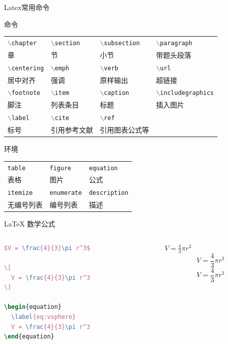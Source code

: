 \documentclass{beamer}
\def\cmd#1{\texttt{\color{red}\footnotesize $\backslash$#1}}
\def\env#1{\texttt{\color{blue}\footnotesize #1}}
\begin{document}
\begin{frame}[fragile]{Latex常用命令}
    \begin{exampleblock}{命令}
        \centering
        \footnotesize
        \begin{tabular}{llll}
            \cmd{chapter} & \cmd{section} & \cmd{subsection} & \cmd{paragraph} \\
            章 & 节 & 小节 & 带题头段落 \\\hline
            \cmd{centering} & \cmd{emph} & \cmd{verb} & \cmd{url} \\
            居中对齐 & 强调 & 原样输出 & 超链接 \\\hline
            \cmd{footnote} & \cmd{item} & \cmd{caption} & \cmd{includegraphics} \\
            脚注 & 列表条目 & 标题 & 插入图片 \\\hline
            \cmd{label} & \cmd{cite} & \cmd{ref} \\
            标号 & 引用参考文献 & 引用图表公式等\\\hline
        \end{tabular}
    \end{exampleblock}
    \begin{exampleblock}{环境}
        \centering
        \footnotesize
        \begin{tabular}{lll}
            \env{table} & \env{figure} & \env{equation}\\
            表格 & 图片 & 公式 \\\hline
            \env{itemize} & \env{enumerate} & \env{description}\\
            无编号列表 & 编号列表 & 描述 \\\hline
        \end{tabular}
    \end{exampleblock}
\end{frame}




\begin{frame}[fragile]{\LaTeX{} 数学公式}
    \begin{columns}
        \begin{column}{.55\textwidth}
\begin{lstlisting}[language=TeX]
$V = \frac{4}{3}\pi r^3$

\[
  V = \frac{4}{3}\pi r^3
\]

\begin{equation}
  \label{eq:vsphere}
  V = \frac{4}{3}\pi r^3
\end{equation}
\end{lstlisting}
        \end{column}
        \begin{column}{.4\textwidth}
            $V = \frac{4}{3}\pi r^3$
            \[
                V = \frac{4}{3}\pi r^3
            \]
            \begin{equation}
                \label{eq:vsphere}
                V = \frac{4}{3}\pi r^3
            \end{equation}
        \end{column}
    \end{columns}
\end{frame}
\end{document}
